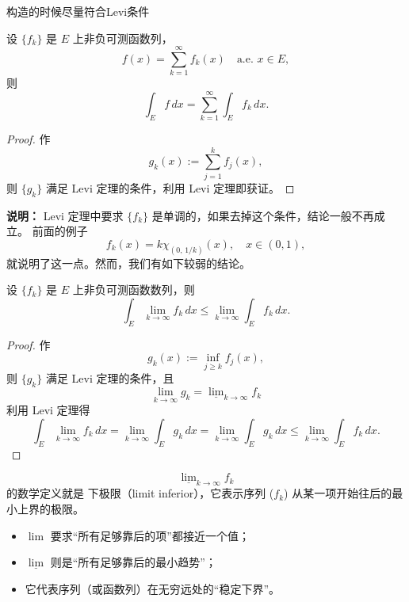 \documentclass[lang=cn,10pt]{elegantbook}
\begin{document}
构造的时候尽量符合Levi条件\\
\begin{corollary}[4.4.1 逐项积分定理]
设 $\{f_k\}$ 是 $E$ 上非负可测函数列，
\[
f(x) = \sum_{k=1}^\infty f_k(x) \quad \text{a.e. } x \in E,
\]
则
\[
\int_E f\,dx = \sum_{k=1}^\infty \int_E f_k\,dx.
\]
\end{corollary}

\begin{proof}
作
\[
g_k(x) := \sum_{j=1}^k f_j(x),
\]
则 $\{g_k\}$ 满足 Levi 定理的条件，利用 Levi 定理即获证。
\end{proof}

\noindent
\textbf{说明：} Levi 定理中要求 $\{f_k\}$ 是单调的，如果去掉这个条件，结论一般不再成立。
前面的例子
\[
f_k(x) = k \chi_{(0,\,1/k)}(x), \quad x \in (0,1),
\]
就说明了这一点。然而，我们有如下较弱的结论。

\begin{theorem}[Fatou 引理]
设 $\{ f_k \}$ 是 $E$ 上非负可测函数数列，则
\[
\int_E \lim_{k \to \infty} f_k \, dx \le \lim_{k \to \infty} \int_E f_k \, dx.
\]
\end{theorem}

\begin{proof}
作
\[
g_k(x) := \inf_{j \ge k} f_j(x),
\]
则 $\{ g_k \}$ 满足 Levi 定理的条件，且
\[
\lim_{k \to \infty} g_k =\underline{\lim}_{k \to \infty} f_k
\]
利用 Levi 定理得
\[
\int_E \lim_{k \to \infty} f_k \, dx
= \lim_{k \to \infty} \int_E g_k \, dx
= \lim_{k \to \infty} \int_E g_k \, dx
\le \lim_{k \to \infty} \int_E f_k \, dx.
\]
\end{proof}
\[\underline{\lim}_{k \to \infty} f_k
\] 的数学定义就是 下极限（limit inferior），它表示序列 ($f_k$) 从某一项开始往后的最小上界的极限。
\begin{itemize}
    \item $\lim$ 要求“所有足够靠后的项”都接近一个值；
    \item $\underline{\lim}$ 则是“所有足够靠后的最小趋势”；
    \item 它代表序列（或函数列）在无穷远处的“稳定下界”。
\end{itemize}
\end{document}
